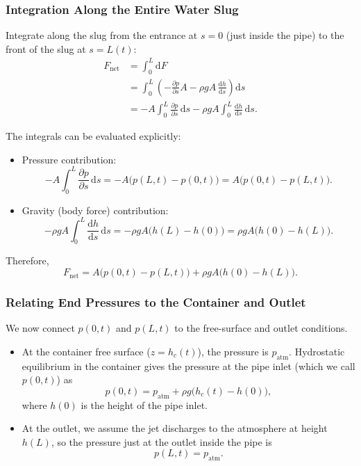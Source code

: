 \documentclass[11pt]{article}
\begin{document}
\subsubsection*{Integration Along the Entire Water Slug}

Integrate along the slug from the entrance at $s=0$ (just inside the pipe) to
the front of the slug at $s=L(t)$:
\begin{align*}
F_{\text{net}}
&= \int_0^{L} \mathrm{d}F \\
&= \int_0^{L} \left(
    -\frac{\partial p}{\partial s} A
    - \rho g A\,\frac{\mathrm{d}h}{\mathrm{d}s}
  \right) \mathrm{d}s \\
&= -A\int_0^{L} \frac{\partial p}{\partial s} \,\mathrm{d}s
   -\rho g A\int_0^{L} \frac{\mathrm{d}h}{\mathrm{d}s}\,\mathrm{d}s.
\end{align*}

The integrals can be evaluated explicitly:
\begin{itemize}
  \item Pressure contribution:
  \[
    -A\int_0^{L} \frac{\partial p}{\partial s} \,\mathrm{d}s
    = -A\bigl(p(L,t) - p(0,t)\bigr)
    = A\bigl(p(0,t) - p(L,t)\bigr).
  \]
  \item Gravity (body force) contribution:
  \[
    -\rho g A\int_0^{L} \frac{\mathrm{d}h}{\mathrm{d}s}\,\mathrm{d}s
    = -\rho g A \bigl(h(L) - h(0)\bigr)
    = \rho g A \bigl(h(0) - h(L)\bigr).
  \]
\end{itemize}
Therefore,
\begin{equation}
F_{\text{net}}
  = A\bigl(p(0,t) - p(L,t)\bigr)
    + \rho g A \bigl(h(0) - h(L)\bigr).
\label{eq:net-force-general}
\end{equation}

\subsubsection*{Relating End Pressures to the Container and Outlet}

We now connect $p(0,t)$ and $p(L,t)$ to the free-surface and outlet conditions.

\begin{itemize}
  \item At the container free surface ($z = h_c(t)$), the pressure is
        $p_{\text{atm}}$. Hydrostatic equilibrium in the container gives the
        pressure at the pipe inlet (which we call $p(0,t)$) as
        \[
        p(0,t) = p_{\text{atm}} + \rho g \bigl(h_c(t) - h(0)\bigr),
        \]
        where $h(0)$ is the height of the pipe inlet.

  \item At the outlet, we assume the jet discharges to the atmosphere at height
        $h(L)$, so the pressure just at the outlet inside the pipe is
        \[
        p(L,t) = p_{\text{atm}}.
        \]
\end{itemize}
\end{document}
